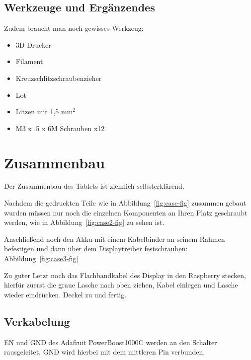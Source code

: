 \subsection{Werkzeuge und Ergänzendes}
Zudem braucht man noch gewisses Werkzeug:
\begin{itemize}
\item 3D Drucker 
\item Filament  
\item Kreuzschlitzschraubenzieher 
\item Lot 
\item Litzen mit 1,5 mm$^2$
\item M3 x .5 x 6M Schrauben x12
\end{itemize}

\section{Zusammenbau}

Der Zusammenbau des Tablets ist ziemlich selbsterklärend.


Nachdem die gedruckten Teile wie in Abbildung~\ref{fig:case-fig} zusammen gebaut wurden müssen nur noch die einzelnen Komponenten an Ihren Platz geschraubt werden, wie in Abbildung~\ref{fig:case2-fig} zu sehen ist.


Anschließend noch den Akku mit einem Kabelbinder an seinem Rahmen befestigen und dann über dem Displaytreiber festschrauben: Abbildung~\ref{fig:case3-fig}


Zu guter Letzt noch das Flachbandkabel des Display in den Raspberry stecken, hierfür zuerst die graue Lasche nach oben ziehen, Kabel einlegen und Lasche wieder eindrücken. Deckel zu und fertig.


\subsection{Verkabelung}

EN und GND des Adafruit PowerBoost1000C werden an den Schalter rausgeleitet. GND wird hierbei mit dem mittleren Pin verbunden. 

